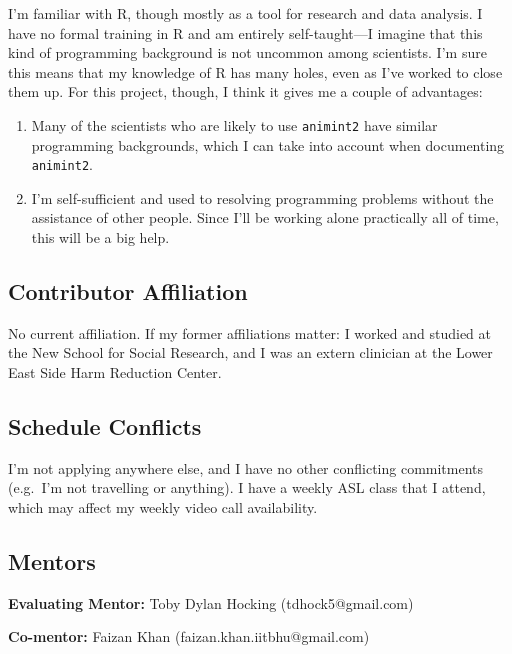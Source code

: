 \documentclass[
]{article}
\providecommand{\tightlist}{%
  \setlength{\itemsep}{0pt}\setlength{\parskip}{0pt}}\usepackage{longtable,booktabs,array}
\begin{document}
I'm familiar with R, though mostly as a tool for research and data
analysis. I have no formal training in R and am entirely self-taught---I
imagine that this kind of programming background is not uncommon among
scientists. I'm sure this means that my knowledge of R has many holes,
even as I've worked to close them up. For this project, though, I think
it gives me a couple of advantages:

\begin{enumerate}
\def\labelenumi{\arabic{enumi}.}
\tightlist
\item
  Many of the scientists who are likely to use \texttt{animint2} have
  similar programming backgrounds, which I can take into account when
  documenting \texttt{animint2}.
\item
  I'm self-sufficient and used to resolving programming problems without
  the assistance of other people. Since I'll be working alone
  practically all of time, this will be a big help.
\end{enumerate}

\hypertarget{contributor-affiliation}{%
\subsection{Contributor Affiliation}\label{contributor-affiliation}}

No current affiliation. If my former affiliations matter: I worked and
studied at the New School for Social Research, and I was an extern
clinician at the Lower East Side Harm Reduction Center.

\hypertarget{schedule-conflicts}{%
\subsection{Schedule Conflicts}\label{schedule-conflicts}}

I'm not applying anywhere else, and I have no other conflicting
commitments (e.g.~I'm not travelling or anything). I have a weekly ASL
class that I attend, which may affect my weekly video call availability.

\hypertarget{mentors}{%
\subsection{Mentors}\label{mentors}}

\textbf{Evaluating Mentor:} Toby Dylan Hocking (tdhock5@gmail.com)

\textbf{Co-mentor:} Faizan Khan (faizan.khan.iitbhu@gmail.com)
\end{document}
